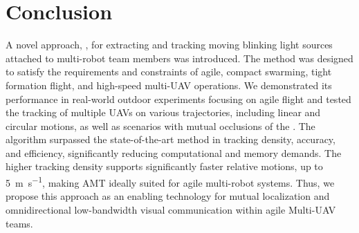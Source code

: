 \documentclass[lettersize,preprint]{elsarticle}
\begin{document}
\section{Conclusion}\label{sec:conclusion}
A novel approach, , for extracting and tracking moving blinking light sources attached to multi-robot team members was introduced. 
The method was designed to satisfy the requirements and constraints of agile, compact swarming, tight formation flight, and high-speed multi-\gls{UAV} operations.
We demonstrated its performance in real-world outdoor experiments focusing on agile flight and tested the tracking of multiple \glspl{UAV} on various trajectories, including linear and circular motions, as well as scenarios with mutual occlusions of the .
The algorithm surpassed the state-of-the-art method in tracking density, accuracy, and efficiency, significantly reducing computational and memory demands.
The higher tracking density supports significantly faster relative motions, up to \SI{5}{\meter\per\second}, making \gls{AMT} ideally suited for agile multi-robot systems.
Thus, we propose this approach as an enabling technology for mutual localization and omnidirectional low-bandwidth visual communication within agile Multi-\gls{UAV} teams.


 



\vfill
\end{document}
